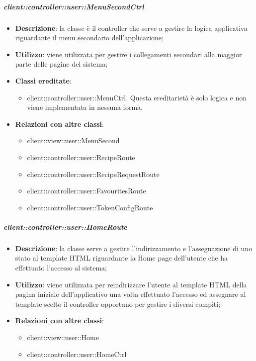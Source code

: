 		\subparagraph{client::controller::user::MenuSecondCtrl} %
		\label{subp:client_controller_user_menusecondctrl}
			\begin{itemize}
				\item \textbf{Descrizione}: la classe è il controller che serve a gestire la logica applicativa riguardante il menu secondario dell'applicazione;
				\item \textbf{Utilizzo}: viene utilizzata per gestire i collegamenti secondari alla maggior parte delle pagine del sistema;
				\item \textbf{Classi ereditate}:
					\begin{itemize}
						\item client::controller::user::MenuCtrl. Questa ereditarietà è solo logica e non viene implementata in nessuna forma.
					\end{itemize}
				\item \textbf{Relazioni con altre classi}:
					\begin{itemize}
						\item client::view::user::MenuSecond
						\item client::controller::user::RecipeRoute
						\item client::controller::user::RecipeRequestRoute
						\item client::controller::user::FavouritesRoute
						\item client::controller::user::TokenConfigRoute
					\end{itemize}
			\end{itemize}


		\subparagraph{client::controller::user::HomeRoute} %
		\label{subp:bdsm_app_client_controller_user_homerouteconfig}
			\begin{itemize}
				\item \textbf{Descrizione}: la classe serve a gestire l'indirizzamento e l'assegnazione di uno stato al template HTML riguardante la Home page dell'utente che ha effettuato l'accesso al sistema;
				\item \textbf{Utilizzo}: viene utilizzata per reindirizzare l'utente al template HTML della pagina iniziale dell'applicativo una volta effettuato l'accesso ed assegnare al template scelto il controller opportuno per gestire i diversi compiti;
				\item \textbf{Relazioni con altre classi}:
					\begin{itemize}
						\item client::view::user::Home
						\item client::controller::user::HomeCtrl
					\end{itemize}
			\end{itemize}

